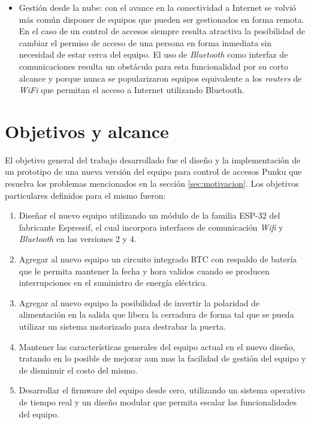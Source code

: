 \begin{itemize}
	\item Gestión desde la nube: con el avance en la conectividad a Internet se volvió más común disponer de equipos que pueden ser gestionados en forma remota. En el caso de un control de accesos siempre resulta atractiva la posibilidad de cambiar el permiso de acceso de una persona en forma inmediata sin necesidad de estar cerca del equipo. El uso de \emph{Bluetooth} como interfaz de comunicaciones resulta un obstáculo para esta funcionalidad por su corto alcance y porque nunca se popularizaron equipos equivalente a los \emph{routers} de \emph{WiFi} que permitan el acceso a Internet utilizando Bluetooth.
\end{itemize}

\section{Objetivos y alcance}
\label{sec:objetivos}

El objetivo general del trabajo desarrollado fue el diseño y la implementación de un prototipo de una nueva versión del equipo para control de accesos Punku que resuelva los problemas mencionados en la sección \ref{sec:motivacion}. Los objetivos particulares definidos para el mismo fueron:

\begin{enumerate}
	\item Diseñar el nuevo equipo utilizando un módulo de la familia ESP-32 del fabricante Espressif, el cual incorpora interfaces de comunicación \emph{Wifi} y \emph{Bluetooth} en las versiones 2 y 4.
	
	\item Agregar al nuevo equipo un circuito integrado RTC con respaldo de batería que le permita mantener la fecha y hora validos cuando se producen interrupciones en el suministro de energía eléctrica.
	
	\item Agregar al nuevo equipo la posibilidad de invertir la polaridad de alimentación en la salida que libera la cerradura de forma tal que se pueda utilizar un sistema motorizado para destrabar la puerta.
	
	\item Mantener las características generales del equipo actual en el nuevo diseño, tratando en lo posible de mejorar aun mas la facilidad de gestión del equipo y de disminuir el costo del mismo.
	
	\item Desarrollar el firmware del equipo desde cero, utilizando un sistema operativo de tiempo real y un diseño modular que permita escalar las funcionalidades del equipo.
\end{enumerate}

